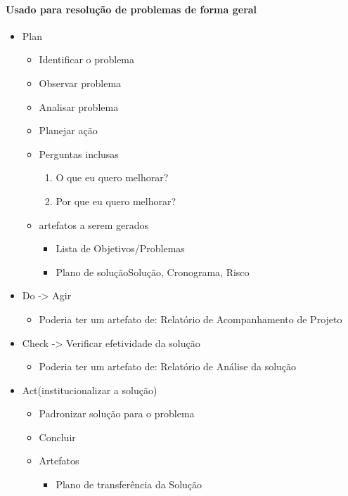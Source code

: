 \documentclass{article}
\begin{document}
\paragraph{Usado para resolução de problemas de forma geral}
	\begin{itemize}
	\item Plan
		\begin{itemize}
		\item Identificar o problema
		\item Observar problema
		\item Analisar problema
		\item Planejar ação	
		
		\item Perguntas inclusas
			\begin{enumerate}
			\item O que eu quero melhorar?
			\item Por que eu quero melhorar?
			
			\end{enumerate}
		\item artefatos a serem gerados
			\begin{itemize}
			\item Lista de Objetivos/Problemas
			\item Plano de solução{Solução, Cronograma, Risco}
			\end{itemize}									
		\end{itemize}				

	\item Do -> Agir
		\begin{itemize}
		\item Poderia ter um artefato de: Relatório de Acompanhamento de Projeto
		\end{itemize}
	\item Check -> Verificar efetividade da solução
		\begin{itemize}
		\item Poderia ter um artefato de: Relatório de Análise da solução
		\end{itemize}
	\item Act(institucionalizar a solução)
		\begin{itemize}
		\item Padronizar solução para o problema
		\item Concluir
		\item Artefatos
			\begin{itemize}
			\item Plano de transferência da Solução
			\end{itemize}
		\end{itemize}			
		
	\end{itemize}
	
\end{document}
